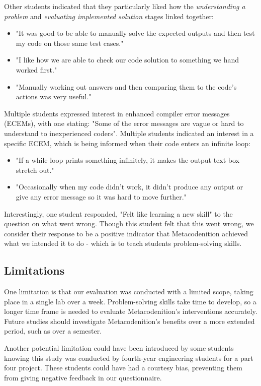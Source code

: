 \documentclass[sigconf,authorversion,nonacm]{acmart}
\begin{document}
Other students indicated that they particularly liked how the \emph{understanding a problem} and \emph{evaluating implemented solution} stages linked together:
\begin{itemize}
    \item "It was good to be able to manually solve the expected outputs and then test my code on those same test cases."
    \item "I like how we are able to check our code solution to something we hand worked first."
    \item "Manually working out answers and then comparing them to the code's actions was very useful."
\end{itemize}

Multiple students expressed interest in enhanced compiler error messages (ECEMs), with one stating: "Some of the error messages are vague or hard to understand to inexperienced coders". Multiple students indicated an interest in a specific ECEM, which is being informed when their code enters an infinite loop:
\begin{itemize}
    \item "If a while loop prints something infinitely, it makes the output text box stretch out."
    \item "Occasionally when my code didn't work, it didn't produce any output or give any error message so it was hard to move further."
\end{itemize}

Interestingly, one student responded, "Felt like learning a new skill" to the question on what went wrong. Though this student felt that this went wrong, we consider their response to be a positive indicator that Metacodenition achieved what we intended it to do - which is to teach students problem-solving skills.

\subsection{Limitations}
One limitation is that our evaluation was conducted with a limited scope, taking place in a single lab over a week. Problem-solving skills take time to develop, so a longer time frame is needed to evaluate Metacodenition's interventions accurately. Future studies should investigate Metacodenition's benefits over a more extended period, such as over a semester.

Another potential limitation could have been introduced by some students knowing this study was conducted by fourth-year engineering students for a part four project. These students could have had a courtesy bias, preventing them from giving negative feedback in our questionnaire.
\end{document}
